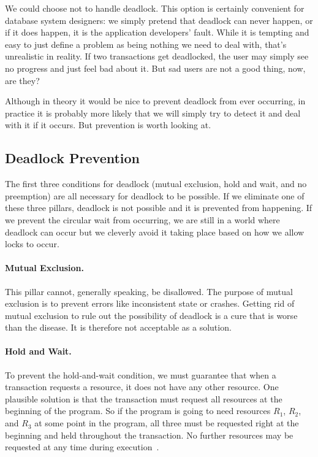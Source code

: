We could choose not to handle deadlock. This option is certainly convenient for database system designers: we simply pretend that deadlock can never happen, or if it does happen, it is the application developers' fault. While it is tempting and easy to just define a problem as being nothing we need to deal with, that's unrealistic in reality. If two transactions get deadlocked, the user may simply see no progress and just feel bad about it. But sad users are not a good thing, now, are they?

Although in theory it would be nice to prevent deadlock from ever occurring, in practice it is probably more likely that we will simply try to detect it and deal with it if it occurs. But prevention is worth looking at.

\subsection*{Deadlock Prevention}

 The first three conditions for deadlock (mutual exclusion, hold and wait, and no preemption) are all necessary for deadlock to be possible. If we eliminate one of these three pillars, deadlock is not possible and it is prevented from happening. If we prevent the circular wait from occurring, we are still in a world where deadlock can occur but we cleverly avoid it taking place based on how we allow locks to occur.

\paragraph{Mutual Exclusion.} This pillar cannot, generally speaking, be disallowed. The purpose of  mutual exclusion is to prevent errors like inconsistent state or crashes. Getting rid of mutual exclusion to rule out the possibility of deadlock is a cure that is worse than the disease. It is therefore not acceptable as a solution.

\paragraph{Hold and Wait.} To prevent the hold-and-wait condition, we must guarantee that when a transaction requests a resource, it does not have any other resource. One plausible solution is that the transaction must request all resources at the beginning of the program. So if the program is going to need resources $R_{1}$, $R_{2}$, and $R_{3}$ at some point in the program, all three must be requested right at the beginning and held throughout the transaction. No further resources may be requested at any time during execution~\cite{osc}.

